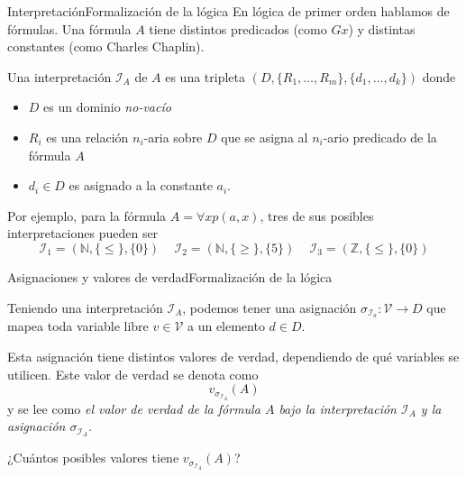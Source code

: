 \documentclass[spanish, c]{beamer}
\begin{document}
\begin{frame}{Interpretación}{Formalización de la lógica}
    En lógica de primer orden hablamos de fórmulas. Una fórmula $A$ tiene distintos predicados (como $Gx$) y distintas constantes (como Charles Chaplin). \pause

    Una \alert{interpretación} $\mathscr{I}_A$ de $A$ es una tripleta $(D, \{R_1, \dots, R_m\}, \{d_1, \dots, d_k\})$ donde

    \begin{itemize}
        \item $D$ es un dominio \textit{no-vacío}
        \item $R_i$ es una relación $n_i$-aria sobre $D$ que se asigna al $n_i$-ario predicado de la fórmula $A$
        \item $d_i \in D$ es asignado a la constante $a_i$.
    \end{itemize} \pause

    Por ejemplo, para la fórmula $A = \forall x p(a,x)$, tres de sus posibles interpretaciones pueden ser
        $$\mathscr{I}_1 = (\mathbb{N}, \{\leq\}, \{0\}) \quad \,
        \mathscr{I}_2 = (\mathbb{N}, \{\geq\}, \{5\}) \quad \,
        \mathscr{I}_3 = (\mathbb{Z}, \{\leq\}, \{0\})$$
    \end{frame}

\begin{frame}{Asignaciones y valores de verdad}{Formalización de la lógica}

    Teniendo una interpretación $\mathscr{I}_A$, podemos tener una \alert{asignación} $\sigma_{\mathscr{I}_a} \colon \mathscr{V} \to D$ que mapea toda variable libre $v \in \mathscr{V}$ a un elemento $d \in D$. \pause

    Esta asignación tiene distintos valores de verdad, dependiendo de qué variables se utilicen. Este valor de verdad se denota como
    $$v_{\sigma_{\mathscr{I}_A}}(A)$$ \pause
    y se lee como \textit{el valor de verdad de la fórmula $A$ bajo la interpretación $\mathscr{I}_A$ y la asignación $\sigma_{\mathscr{I}_A}$}. \pause

    ¿Cuántos posibles valores tiene $v_{\sigma_{\mathscr{I}_A}}(A)$?
\end{frame}
\end{document}
